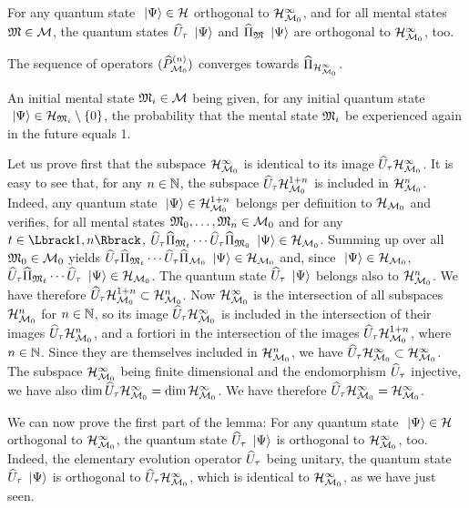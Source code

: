  For any quantum state $\ \left|{\Psi}\right\rangle \in \mathcal H$ orthogonal to $\mathcal H_{\mathcal M_0}^\infty$, and for all mental states $\mathfrak{M} \in \mathcal M$, the quantum states $\widehat{U}_\tau \ \left|{\Psi}\right\rangle$ and $\widehat{\Pi}_{\mathfrak{M}} \ \left|{\Psi}\right\rangle$ are orthogonal to $\mathcal H_{\mathcal M_0}^\infty$, too.

 The sequence of operators $(\widehat{P}_{\mathcal M_0}^{(n)})$ converges towards $\widehat{\Pi}_{\mathcal H_{\mathcal M_0}^\infty}$.

 An initial mental state $\mathfrak{M}_i \in \mathcal M$ being given, for any initial quantum state $\ \left|{\Psi}\right\rangle \in \mathcal H_{\mathfrak{M}_i} \setminus \{0\}$, the probability that the mental state $\mathfrak{M}_i$ be experienced again in the future equals 1.

 Let us prove first that the subspace $\mathcal H_{\mathcal M_0}^\infty$ is identical to its image $\widehat{U}_\tau \mathcal H_{\mathcal M_0}^\infty$. It is easy to see that, for any $n \in \mathbb{N}$, the subspace $\widehat{U}_\tau \mathcal H_{\mathcal M_0}^{1+n}$ is included in $\mathcal H_{\mathcal M_0}^n$. Indeed, any quantum state $\ \left|{\Psi}\right\rangle \in \mathcal H_{\mathcal M_0}^{1+n}$ belongs per definition to $\mathcal H_{\mathcal M_0}$ and verifies, for all mental states $\mathfrak{M}_0, \dotsc, \mathfrak{M}_n \in \mathcal M_0$ and for any $t \in \IntRange{1}{n}$, $\widehat{U}_\tau \widehat{\Pi}_{\mathfrak{M}_t} \dotsm \widehat{U}_\tau \widehat{\Pi}_{\mathfrak{M}_0} \ \left|{\Psi}\right\rangle \in \mathcal H_{\mathcal M_0}$. Summing up over all $\mathfrak{M}_0 \in \mathcal M_0$ yields $\widehat{U}_\tau \widehat{\Pi}_{\mathfrak{M}_t} \dotsm \widehat{U}_\tau \widehat{\Pi}_{\mathcal M_0} \ \left|{\Psi}\right\rangle \in \mathcal H_{\mathcal M_0}$ and, since $\ \left|{\Psi}\right\rangle \in \mathcal H_{\mathcal M_0}$, $\widehat{U}_\tau \widehat{\Pi}_{\mathfrak{M}_t} \dotsm \widehat{U}_\tau \ \left|{\Psi}\right\rangle \in \mathcal H_{\mathcal M_0}$. The quantum state $\widehat{U}_\tau \ \left|{\Psi}\right\rangle$ belongs also to $\mathcal H_{\mathcal M_0}^n$. We have therefore $\widehat{U}_\tau \mathcal H_{\mathcal M_0}^{1+n} \subset \mathcal H_{\mathcal M_0}^n$. Now $\mathcal H_{\mathcal M_0}^\infty$ is the intersection of all subspaces $\mathcal H_{\mathcal M_0}^n$ for $n \in \mathbb{N}$, so its image $\widehat{U}_\tau \mathcal H_{\mathcal M_0}^\infty$ is included in the intersection of their images $\widehat{U}_\tau \mathcal H_{\mathcal M_0}^n$, and a fortiori in the intersection of the images $\widehat{U}_\tau \mathcal H_{\mathcal M_0}^{1+n}$, where $n \in \mathbb{N}$. Since they are themselves included in $\mathcal H_{\mathcal M_0}^n$, we have $\widehat{U}_\tau \mathcal H_{\mathcal M_0}^\infty \subset \mathcal H_{\mathcal M_0}^\infty$. The subspace $\mathcal H_{\mathcal M_0}^\infty$ being finite dimensional and the endomorphism $\widehat{U}_\tau$ injective, we have also $\dim \widehat{U}_\tau \mathcal H_{\mathcal M_0}^\infty = \dim \mathcal H_{\mathcal M_0}^\infty$. We have therefore $\widehat{U}_\tau \mathcal H_{\mathcal M_0}^\infty = \mathcal H_{\mathcal M_0}^\infty$.

 We can now prove the first part of the lemma: For any quantum state $\ \left|{\Psi}\right\rangle \in \mathcal H$ orthogonal to $\mathcal H_{\mathcal M_0}^\infty$, the quantum state $\widehat{U}_\tau \ \left|{\Psi}\right\rangle$ is orthogonal to $\mathcal H_{\mathcal M_0}^\infty$, too. Indeed, the elementary evolution operator $\widehat{U}_\tau$ being unitary, the quantum state $\widehat{U}_\tau \ \left|{\Psi}\right\rangle$ is orthogonal to $\widehat{U}_\tau \mathcal H_{\mathcal M_0}^\infty$, which is identical to $\mathcal H_{\mathcal M_0}^\infty$, as we have just seen.

